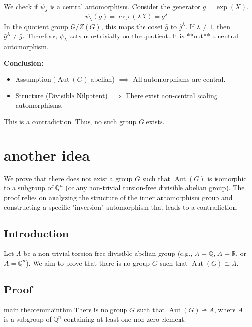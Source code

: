 \documentclass{book}
\newcommand{\Aut}{{\operatorname{Aut}}}
\begin{document}
We check if $\psi_\lambda$ is a central automorphism.
Consider the generator $g = \exp(X)$.
\[ \psi_\lambda(g) = \exp(\lambda X) = g^\lambda \]
In the quotient group $G/Z(G)$, this maps the coset $\bar{g}$ to $\bar{g}^\lambda$.
If $\lambda \neq 1$, then $\bar{g}^\lambda \neq \bar{g}$.
Therefore, $\psi_\lambda$ acts non-trivially on the quotient. It is **not** a central automorphism.

\textbf{Conclusion:}
\begin{itemize}
    \item Assumption ($\Aut(G)$ abelian) $\implies$ All automorphisms are central.
    \item Structure (Divisible Nilpotent) $\implies$ There exist non-central scaling automorphisms.
\end{itemize}
This is a contradiction. Thus, no such group $G$ exists.

\chapter{another idea}



We prove that there does not exist a group $G$ such that $\operatorname{Aut}(G)$ is isomorphic to a subgroup of $\mathbb{Q}^n$ (or any non-trivial torsion-free divisible abelian group). The proof relies on analyzing the structure of the inner automorphism group and constructing a specific "inversion" automorphism that leads to a contradiction.

\section{Introduction}

Let $A$ be a non-trivial torsion-free divisible abelian group (e.g., $A = \mathbb{Q}$, $A = \mathbb{R}$, or $A = \mathbb{Q}^n$). We aim to prove that there is no group $G$ such that $\operatorname{Aut}(G) \cong A$.

\section{Proof}

\begin{thm}{main theorem}{mainthm}
There is no group $G$ such that $\operatorname{Aut}(G) \cong A$, where $A$ is a subgroup of $\mathbb{Q}^n$ containing at least one non-zero element.
\end{thm}
\end{document}
